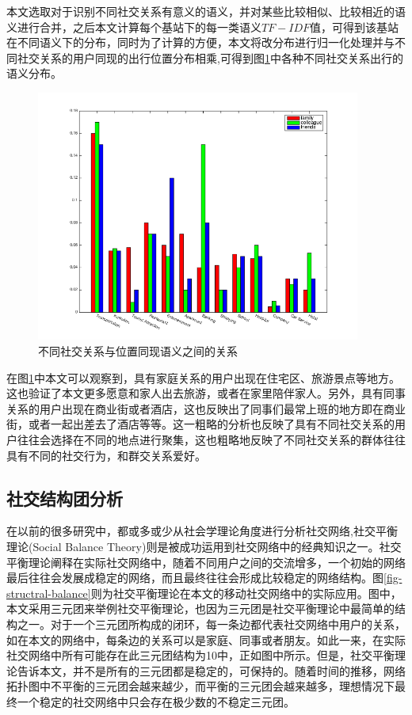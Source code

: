 本文选取对于识别不同社交关系有意义的语义，并对某些比较相似、比较相近的语义进行合并，之后本文计算每个基站下的每一类语义$TF-IDF$值，可得到该基站在不同语义下的分布，同时为了计算的方便，本文将改分布进行归一化处理并与不同社交关系的用户同现的出行位置分布相乘,可得到图\ref{fig-spatial-context}中各种不同社交关系出行的语义分布。



\begin{figure}[ht]
    \centering
    \includegraphics[scale=1, width=0.95\textwidth]{figure/contextDistribution.png}
    \caption{不同社交关系与位置同现语义之间的关系}
    \label{fig-spatial-context}
\end{figure}


在图\ref{fig-spatial-context}中本文可以观察到，具有家庭关系的用户出现在住宅区、旅游景点等地方。这也验证了本文更多愿意和家人出去旅游，或者在家里陪伴家人。另外，具有同事关系的用户出现在商业街或者酒店，这也反映出了同事们最常上班的地方即在商业街，或者一起出差去了酒店等等。这一粗略的分析也反映了具有不同社交关系的用户往往会选择在不同的地点进行聚集，这也粗略地反映了不同社交关系的群体往往具有不同的社交行为，和群交关系爱好。



\subsection{社交结构团分析}
在以前的很多研究中，都或多或少从社会学理论角度进行分析社交网络,社交平衡理论(Social Balance Theory)则是被成功运用到社交网络中的经典知识之一。社交平衡理论阐释在实际社交网络中，随着不同用户之间的交流增多，一个初始的网络最后往往会发展成稳定的网络，而且最终往往会形成比较稳定的网络结构。图\ref{fig-structral-balance}则为社交平衡理论在本文的移动社交网络中的实际应用。图中，本文采用三元团来举例社交平衡理论，也因为三元团是社交平衡理论中最简单的结构之一。对于一个三元团所构成的闭环，每一条边都代表社交网络中用户的关系，如在本文的网络中，每条边的关系可以是家庭、同事或者朋友。如此一来，在实际社交网络中所有可能存在此三元团结构为10中，正如图中所示。但是，社交平衡理论告诉本文，并不是所有的三元团都是稳定的，可保持的。随着时间的推移，网络拓扑图中不平衡的三元团会越来越少，而平衡的三元团会越来越多，理想情况下最终一个稳定的社交网络中只会存在极少数的不稳定三元团。



